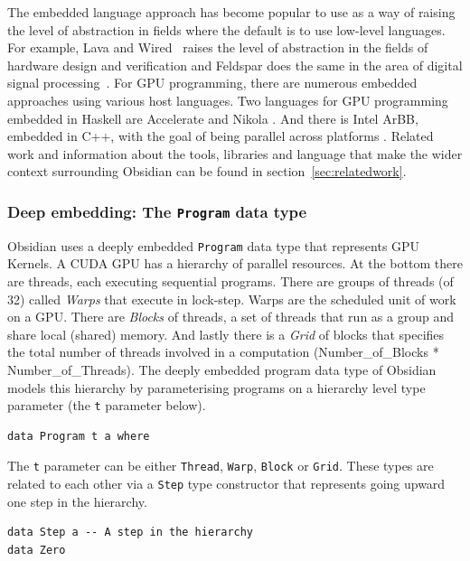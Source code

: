 \documentclass[a4paper]{book}
\begin{document}
The embedded language approach has become popular to use as a way of raising the 
level of abstraction in fields where the default is to use low-level languages. 
For example, Lava and Wired~\citet{LAVA,Wired} raises the level of abstraction in the 
fields of hardware design and verification and Feldspar does the same in the area of  
digital signal processing~\citet{FELDSPAR2010}. For GPU programming, there are numerous 
embedded approaches using various host languages. Two languages for GPU programming 
embedded in Haskell are  Accelerate and Nikola \citet{ACCELERATEDAMP11, NIKOLA}. 
And there is Intel ArBB, embedded in C++, with the goal of being parallel across 
platforms \citet{ARBB2011}. Related work and information about the tools, libraries 
and language that make the wider context surrounding Obsidian can be found in 
section~\ref{sec:relatedwork}. 

\subsubsection{Deep embedding: The {\tt Program} data type}

Obsidian uses a deeply embedded {\tt Program} data type that represents GPU Kernels. 
A CUDA GPU has a hierarchy of parallel resources. At the bottom there are threads, each 
executing sequential programs. There are groups of threads (of 32) called {\em Warps} that 
execute in lock-step. Warps are the scheduled unit of work on a GPU. There are {\em Blocks} 
of threads, a set of threads that run as a group and share local (shared) memory. And 
lastly there is a {\em Grid} of blocks that specifies the total number of threads involved 
in a computation (Number\_of\_Blocks * Number\_of\_Threads). The deeply embedded program 
data type of Obsidian models this hierarchy by parameterising programs on a hierarchy 
level type parameter (the  {\tt t} parameter below).

\begin{verbatim} 
data Program t a where
\end{verbatim}

The {\tt t} parameter can be either {\tt Thread}, {\tt Warp}, {\tt Block} or {\tt Grid}.
These types are related to each other via a {\tt Step} type constructor that represents 
going upward one step in the hierarchy. 

\begin{verbatim} 
data Step a -- A step in the hierarchy
data Zero
\end{verbatim} 
\end{document}
